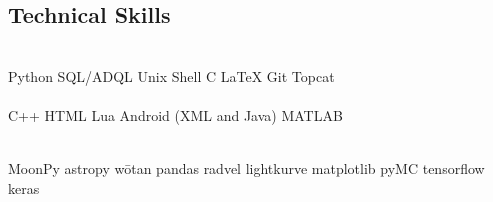 \documentclass[]{deedy-resume-openfont}
\newcommand{\ExternalLink}{%
    \tikz[x=1.2ex, y=1.2ex, baseline=-0.05ex]{%
        \begin{scope}[x=1ex, y=1ex]
            \clip (-0.1,-0.1) 
                --++ (-0, 1.2) 
                --++ (0.6, 0) 
                --++ (0, -0.6) 
                --++ (0.6, 0) 
                --++ (0, -1);
            \path[draw, 
                line width = 0.5, 
                rounded corners=0.5] 
                (0,0) rectangle (1,1);
        \end{scope}
        \path[draw, line width = 0.5] (0.5, 0.5) 
            -- (1, 1);
        \path[draw, line width = 0.5] (0.6, 1) 
            -- (1, 1) -- (1, 0.6);
        }
    }
\let\orighref\href
\renewcommand{\href}[2]{\orighref{#1}{#2\,\ExternalLink}}
\begin{document}
\begin{minipage}[t]{0.35\textwidth}
\sectionsep
\hline
\sectionsep


\subsection{Technical Skills}
\\
\textbullet{}Python \textbullet{}SQL/ADQL \textbullet{}Unix Shell \textbullet{}C
\textbullet{}\LaTeX
\textbullet{}Git
\textbullet{}Topcat\\ 

\\
\textbullet{}C++ 
\textbullet{}HTML
\textbullet{}Lua
\textbullet{}Android (XML and Java)
\textbullet{}MATLAB

\\ \textbullet{}MoonPy \textbullet{}astropy \textbullet{}wōtan \textbullet{}pandas \textbullet{}radvel \textbullet{}lightkurve
\textbullet{}matplotlib
\textbullet{}pyMC \textbullet{}tensorflow \textbullet{}keras
\vspace{0.05in}
%
%

\end{minipage} 
\hfill\vline\hfill
\end{document}
